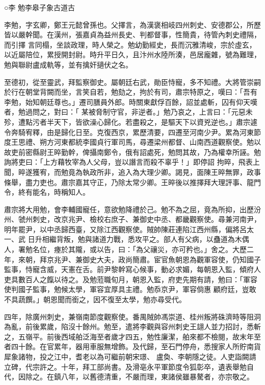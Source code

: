 
\begin{pinyinscope}

 ○李
 勉李皋子象古道古



 李勉，字玄卿，鄭王元懿曾孫也。父擇言，為漢褒相岐四州刺史、安德郡公，所歷皆以嚴幹聞。在漢州，張嘉貞為益州長史、判都督事，性簡貴，待管內刺史禮隔，而引擇
 言同榻，坐談政理，時人榮之。勉幼勤經史，長而沉雅清峻，宗於虛玄，以近屬陪位，累授開封尉。時升平日久，且汴州水陸所湊，邑居龐雜，號為難理，勉與聯尉盧成軌等，並有擒奸擿伏之名。



 至德初，從至靈武，拜監察御史。屬朝廷右武，勛臣恃寵，多不知禮。大將管崇嗣於行在朝堂背闕而坐，言笑自若，勉劾之，拘於有司，肅宗特原之，嘆曰：「吾有李勉，始知朝廷尊也。」遷司膳員外郎。時關東獻俘百餘，詔並處斬，囚有仰天嘆者，勉過問之，對曰：「
 某被脅制守官，非逆者。」勉乃哀之，上言曰：「元惡未殄，遭點污者半天下，皆欲澡心歸化。若盡殺之，是驅天下以資兇逆也。」肅宗遽令奔騎宥釋，由是歸化日至。克復西京，累歷清要，四遷至河南少尹。累為河東節度王思禮、朔方河東都統李國貞行軍司馬，尋遷梁州都督、山南西道觀察使。勉以故吏前密縣尉王晬勤幹，俾攝南鄭令，俄有詔處死，勉問其故，乃為權幸所誣。勉詢將吏曰：「上方藉牧宰為人父母，豈以譖言而殺不辜乎！」即停詔
 拘晬，飛表上聞，晬遂獲宥，而勉竟為執政所非，追入為大理少卿。謁見，面陳王晬無罪，政事條舉，盡力吏也。肅宗嘉其守正，乃除太常少卿。王晬後以推擇拜大理評事、龍門令，終有能名，時稱知人。



 肅宗將大用勉，會李輔國寵任，意欲勉降禮於己。勉不為之屈，竟為所抑，出歷汾州、虢州刺史，改京兆尹、檢校右庶子、兼御史中丞、都畿觀察使。尋兼河南尹，明年罷尹，以中丞歸西臺，又除江西觀察使。賊帥陳莊連陷江西州縣，偏將呂太一、武
 日升相繼背叛，勉與諸道力戰，悉攻平之。部人有父病，以蠱道為木偶人，署勉名位，瘞於其隴，或以告，曰：「為父禳災，亦可矜也。」舍之。大歷二年，來朝，拜京兆尹、兼御史大夫，政尚簡肅。宦官魚朝恩為觀軍容使，仍知國子監事，恃寵含威，天憲在舌。前尹黎幹寫心候事，動必求媚，每朝恩入監，傾府人吏具數百人之餼以待之。及勉蒞職旬月，朝恩入監，府吏先期有請，勉曰：「軍容使判國子監事，勉候太學，軍容宜厚具主禮。勉忝京尹，軍容倘惠
 顧府廷，豈敢不具蔬饌。」朝恩聞而銜之，因不復至太學，勉亦尋受代。



 四年，除廣州刺史，兼嶺南節度觀察使。番禺賊帥馮崇道、桂州叛將硃濟時等阻洞為亂，前後累歲，陷沒十餘州。勉至，遣將李觀與容州刺史王翃人並力招討，悉斬之，五嶺平。前後西域舶泛海至者歲才四五，勉性廉潔，舶來都不檢閱，故末年至者四十餘。在官累年，器用車服無增飾。及代歸，至石門停舟，悉搜家人所貯南貨犀象諸物，投之江中，耆老以為可繼前朝宋璟、
 盧奐、李朝隱之徒。人吏詣闕請立碑，代宗許之。十年，拜工部尚書。及滑亳永平軍節度令狐彰卒，遺表舉勉自代，因除之。在鎮八年，以舊德清重，不嚴而理，東諸侯雖暴驁者，亦宗敬之。




\end{pinyinscope}
